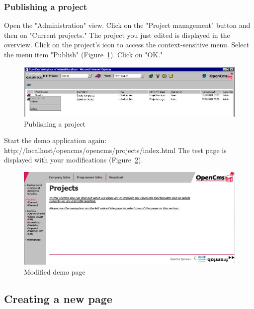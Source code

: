 \subsubsection{Publishing a project}

Open the "Administration" view. Click on the "Project management"
button and then on "Current projects." The project you just edited
is displayed in the overview. Click on the project's icon to
access the context-sensitive menu. Select the menu item "Publish"
(Figure~\ref{publishproject}). Click on "OK."

\begin{figure}[h]
\begin{center}
\includegraphics[width=\sgw]
                   {pics/usermanual/publishProject01}
\caption[Publishing a project]
           {Publishing a project}
\label{publishproject}
\end{center}
\end{figure}

Start the demo application again:
http://localhost/opencms/opencms/projects/index.html The test page
is displayed with your modifications (Figure~\ref{demopage02}).

\begin{figure}[h]
\begin{center}
\includegraphics[width=\sgw]
                   {pics/usermanual/demoPage02}
\caption[Modified demo page]
           {Modified demo page}
\label{demopage02}
\end{center}
\end{figure}

\subsection{Creating a new page}

